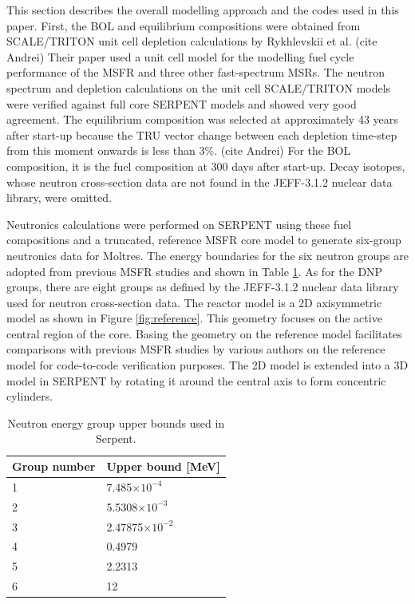 \documentclass{anstrans}
\begin{document}
	This section describes the overall modelling approach and the codes used
	in this paper. First, the \gls{BOL} and equilibrium compositions were
	obtained from SCALE/TRITON unit cell depletion calculations by Rykhlevskii
	et al. (cite Andrei) Their paper used a unit cell model for the modelling
	fuel cycle performance of the \gls{MSFR} and three other fast-spectrum
	\glspl{MSR}. The neutron spectrum and depletion calculations on the unit
	cell SCALE/TRITON models were verified against full core SERPENT models and
	showed very good agreement. The equilibrium composition was selected at
	approximately 43 years after start-up because the TRU vector change
	between each depletion time-step from this moment onwards is less than 3\%.
	(cite Andrei) For the \gls{BOL} composition, it is the fuel composition at
	300 days after start-up. Decay isotopes, whose neutron cross-section data
	are not found in the
	JEFF-3.1.2 nuclear data library, were omitted.
	
	Neutronics calculations were performed on SERPENT using these fuel
	compositions and a truncated, reference \gls{MSFR} core model
	\cite{pettersen_coupled_2016} to generate six-group neutronics data for
	Moltres.
	The energy boundaries for the six neutron groups are adopted from previous
	\gls{MSFR} studies and shown in Table \ref{table:bound}.
	As for the \gls{DNP} groups, there are eight groups as defined by the
	JEFF-3.1.2 nuclear data library used for neutron cross-section data.
	The reactor model is a 2D axisymmetric model as shown in
	Figure \ref{fig:reference}. This geometry focuses on the active central
	region of the core. Basing the geometry on the reference model facilitates
	comparisons with previous MSFR studies by various authors
	\cite{fiorina_modelling_2014} \cite{pettersen_coupled_2016} on the
	reference model for code-to-code verification purposes.
	The 2D model is extended into a 3D model in SERPENT by rotating it
	around the central axis to form concentric cylinders.
	
\begin{table}[b]
	\centering
	\captionsetup{justification=centering}
	\caption{Neutron energy group upper bounds used in Serpent.}
	\begin{tabular}{ll}
		\hline
		{Group number} & {Upper bound [MeV]}\\
		\hline
		1 & 7.485$\times 10^{-4}$\\
		2 & 5.5308$\times 10^{-3}$\\
		3 & 2.47875$\times 10^{-2}$\\
		4 & 0.4979\\
		5 & 2.2313\\
		6 & 12\\
		\hline
	\end{tabular}
	\label{table:bound}
\end{table}	
	
\end{document}
